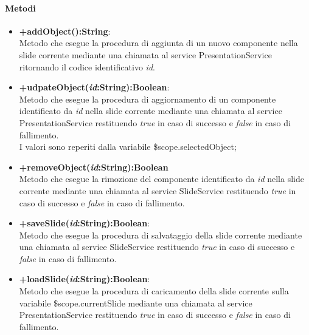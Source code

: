 	\paragraph{Metodi}
	\begin{itemize}
	  \item \textbf{+addObject():String}:\\
		 Metodo che esegue la procedura di aggiunta di un nuovo componente nella slide corrente mediante una chiamata al service PresentationService ritornando il codice identificativo \textit{id}.
	  \item \textbf{+udpateObject(\textit{id}:String):Boolean}:\\
		 Metodo che esegue la procedura di aggiornamento di un componente  identificato da \textit{id} nella slide corrente mediante una chiamata al service PresentationService  restituendo \textit{true} in caso di successo e \textit{false} in caso di fallimento.\\I valori sono reperiti dalla variabile \$scope.selectedObject;
	  \item \textbf{+removeObject(\textit{id}:String):Boolean}\\
		 Metodo che esegue la rimozione del componente identificato da \textit{id} nella slide corrente mediante una chiamata al service SlideService  restituendo \textit{true} in caso di successo e \textit{false} in caso di fallimento.
	  \item \textbf{+saveSlide(\textit{id}:String):Boolean}:\\
		 Metodo che esegue la procedura di salvataggio della slide corrente mediante una chiamata al service SlideService restituendo \textit{true} in caso di successo e \textit{false} in caso di fallimento.
	  \item \textbf{+loadSlide(\textit{id}:String):Boolean}:\\
		 Metodo che esegue la procedura di caricamento della slide corrente sulla variabile \$scope.currentSlide mediante una chiamata al service PresentationService restituendo \textit{true} in caso di successo e \textit{false} in caso di fallimento.

	\end{itemize}
